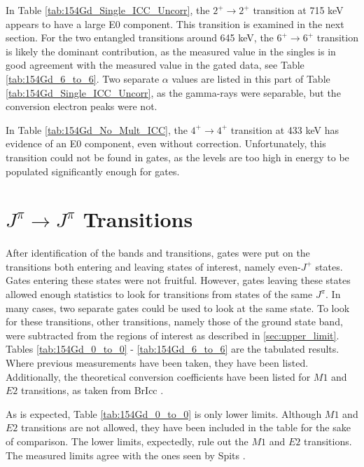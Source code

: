 In Table \ref{tab:154Gd_Single_ICC_Uncorr}, the $2^+\rightarrow2^+$ transition at 715 keV appears to have a large E0 component. This transition is examined in the next section. For the two entangled transitions around 645 keV, the $6^+\rightarrow6^+$ transition is likely the dominant contribution, as the measured value in the singles is in good agreement with the measured value in the gated data, see Table \ref{tab:154Gd_6_to_6}. Two separate $\alpha$ values are listed in this part of Table \ref{tab:154Gd_Single_ICC_Uncorr}, as the gamma-rays were separable, but the conversion electron peaks were not.

In Table \ref{tab:154Gd_No_Mult_ICC}, the $4^+\rightarrow4^+$ transition at 433 keV has evidence of an E0 component, even without correction. Unfortunately, this transition could not be found in gates, as the levels are too high in energy to be populated significantly enough for gates.

\section{$J^{\pi}\rightarrow J^{\pi}$ Transitions}
\label{sec:154_J2J}

After identification of the bands and transitions, gates were put on the transitions both entering and leaving states of interest, namely even-$J^{+}$ states. Gates entering these states were not fruitful. However, gates leaving these states allowed enough statistics to look for transitions from states of the same $J^{\pi}$. In many cases, two separate gates could be used to look at the same state. To look for these transitions, other transitions, namely those of the ground state band, were subtracted from the regions of interest as described in \ref{sec:upper_limit}. Tables \ref{tab:154Gd_0_to_0} - \ref{tab:154Gd_6_to_6} are the tabulated results. Where previous measurements have been taken, they have been listed. Additionally, the theoretical conversion coefficients have been listed for $M1$ and $E2$ transitions, as taken from BrIcc \cite{kibedi08:_BRICC}.

\afterpage{\clearpage}

As is expected, Table \ref{tab:154Gd_0_to_0} is only lower limits. Although $M1$ and $E2$ transitions are not allowed, they have been included in the table for the sake of comparison.  The lower limits, expectedly, rule out the $M1$ and $E2$ transitions. The measured limits agree with the ones seen by Spits \cite{spits96:_154gd}.

